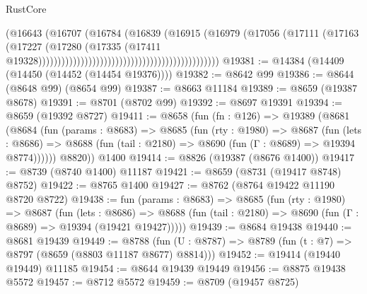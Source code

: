 \begin{lexlean}{RustCore}
\begin{coremodule}
                                                                        (@16643
                                                                          (@16707
                                                                            (@16784
                                                                              (@16839
                                                                                (@16915
                                                                                  (@16979
                                                                                    (@17056
                                                                                      (@17111
                                                                                        (@17163
                                                                                          (@17227
                                                                                            (@17280
                                                                                              (@17335
                                                                                                (@17411
                                                                                                  @19328)))))))))))))))))))))))))))))))))))))))))))))))
@19381 := @14384 (@14409 (@14450 (@14452 (@14454 @19376))))
@19382 := @8642 @99
@19386 := @8644 (@8648 @99) (@8654 @99)
@19387 := @8663 @11184
@19389 := @8659 (@19387 @8678)
@19391 := @8701 (@8702 @99)
@19392 := @8697 @19391
@19394 := @8659 (@19392 @8727)
@19411 := @8658
    (fun (fn : @126) =>
    @19389
      (@8681
        (@8684
          (fun (params : @8683) =>
          @8685
            (fun (rty : @1980) =>
            @8687
              (fun (lets : @8686) =>
              @8688 (fun (tail : @2180) => @8690 (fun (Γ : @8689) => @19394 @8774))))))
        @8820))
    @1400
@19414 := @8826 (@19387 (@8676 @1400))
@19417 := @8739 (@8740 @1400) @11187
@19421 := @8659 (@8731 (@19417 @8748) @8752)
@19422 := @8765 @1400
@19427 := @8762 (@8764 @19422 @11190 @8720 @8722)
@19438 := fun (params : @8683) =>
  @8685
    (fun (rty : @1980) =>
    @8687
      (fun (lets : @8686) =>
      @8688 (fun (tail : @2180) => @8690 (fun (Γ : @8689) => @19394 (@19421 @19427)))))
@19439 := @8684 @19438
@19440 := @8681 @19439
@19449 := @8788
    (fun (U : @8787) => @8789 (fun (t : @7) => @8797 (@8659 (@8803 @11187 @8677) @8814)))
@19452 := @19414 (@19440 @19449) @11185
@19454 := @8644 @19439 @19449
@19456 := @8875 @19438 @5572
@19457 := @8712 @5572
@19459 := @8709 (@19457 @8725)

\end{coremodule}
\end{lexlean}
